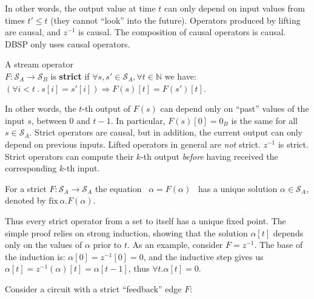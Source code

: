 \documentclass[twocolumn
]{svjour3}
\numberwithin{equation}{section}
\newcommand{\dbsp}{DBSP\xspace}
\newcommand{\defined}[1]{\textbf{#1}\index{}}
\newcommand{\N}{\mathbb{N}}  %
\newcommand{\stream}[1]{\ensuremath{\mathcal{S}_{#1}}}
\newcommand{\zm}{\ensuremath{z^{-1}}} %
\newcommand{\fix}[2]{\mbox{fix}\,#1.#2}
\begin{document}
\noindent
In other words, the output value at time $t$ can only depend on input
values from times $t' \leq t$ (they cannot ``look'' into the future).
Operators produced by lifting are causal, and $\zm$ is causal.  The
composition of causal operators is causal.  \dbsp only uses causal
operators.

\begin{definition}[strictness]
A stream operator \\ $F:\stream{A}\to\stream{B}$
is \defined{strict}
if  $\forall s,s'\in\stream{A}, \forall t \in \N$ we have:
$(\forall i<t~.~s[i]=s'[i]) \Rightarrow F(s)[t]=F(s')[t].$
\end{definition}

In other words, the $t$-th output of $F(s)$ can depend only on
``past'' values of the input $s$, between $0$ and $t-1$.  In
particular, $F(s)[0] = 0_B$ is the same for all $s \in \stream{A}$.
Strict operators are causal, but in addition, the current output can
only depend on previous inputs.  Lifted operators in general are
\emph{not} strict.  $\zm$ is strict.  Strict operators can compute
their $k$-th output \emph{before} having received the corresponding
$k$-th input.

\begin{proposition}
\label{prop-unique-fix}
For a strict $F: \stream{A} \to \stream{A}$ the equation ~$\alpha=F(\alpha)$~ has a unique
solution $\alpha \in \stream{A}$, denoted by $\fix{\alpha}{F(\alpha)}$.
\end{proposition}

Thus every strict operator from a set to itself has a unique fixed
point.  The simple proof relies on strong induction, showing that the
solution $\alpha[t]$ depends only on the values of $\alpha$ prior to
$t$.  As an example, consider $F = \zm$.  The base of the induction
is: $\alpha[0] = \zm[0] = 0$, and the inductive step gives us
$\alpha[t] = \zm(\alpha)[t] = \alpha[t-1]$, thus $\forall t
. \alpha[t] = 0$.

Consider a circuit with a strict ``feedback'' edge $F$:
\begin{center}
\end{center}
\end{document}
